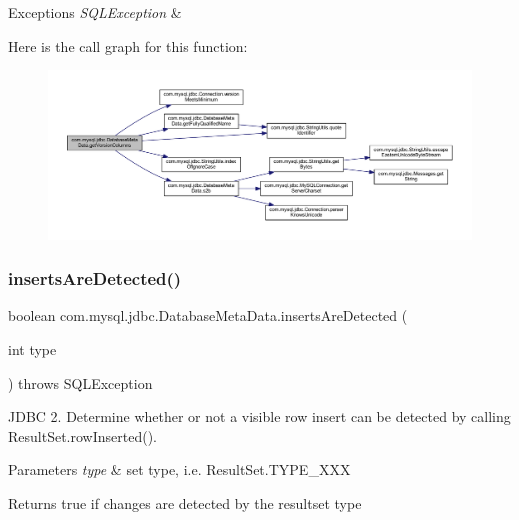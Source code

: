 \begin{DoxyExceptions}{Exceptions}
{\em S\+Q\+L\+Exception} & \\
\hline
\end{DoxyExceptions}
Here is the call graph for this function\+:
\nopagebreak
\begin{figure}[H]
\begin{center}
\leavevmode
\includegraphics[width=350pt]{classcom_1_1mysql_1_1jdbc_1_1_database_meta_data_ad37428c615c19cdc6330887196659957_cgraph}
\end{center}
\end{figure}
\mbox{\label{classcom_1_1mysql_1_1jdbc_1_1_database_meta_data_a06d1f2ed6eef1ddae5b42a8606644903}} 
\subsubsection{\texorpdfstring{inserts\+Are\+Detected()}{insertsAreDetected()}}
{\footnotesize\ttfamily boolean com.\+mysql.\+jdbc.\+Database\+Meta\+Data.\+inserts\+Are\+Detected (\begin{DoxyParamCaption}\item[{int}]{type }\end{DoxyParamCaption}) throws S\+Q\+L\+Exception}

J\+D\+BC 2. Determine whether or not a visible row insert can be detected by calling Result\+Set.\+row\+Inserted().


\begin{DoxyParams}{Parameters}
{\em type} & set type, i.\+e. Result\+Set.\+T\+Y\+P\+E\+\_\+\+X\+XX \\
\hline
\end{DoxyParams}
\begin{DoxyReturn}{Returns}
true if changes are detected by the resultset type 
\end{DoxyReturn}

